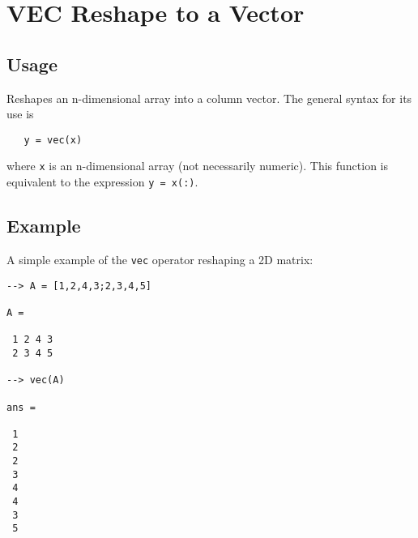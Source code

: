 \section{VEC Reshape to a Vector}

\subsection{Usage}

Reshapes an n-dimensional array into a column vector.  The general
syntax for its use is
\begin{verbatim}
   y = vec(x)
\end{verbatim}
where \verb|x| is an n-dimensional array (not necessarily numeric).  This
function is equivalent to the expression \verb|y = x(:)|.
\subsection{Example}

A simple example of the \verb|vec| operator reshaping a 2D matrix:
\begin{verbatim}
--> A = [1,2,4,3;2,3,4,5]

A = 

 1 2 4 3 
 2 3 4 5 

--> vec(A)

ans = 

 1 
 2 
 2 
 3 
 4 
 4 
 3 
 5 
\end{verbatim}
